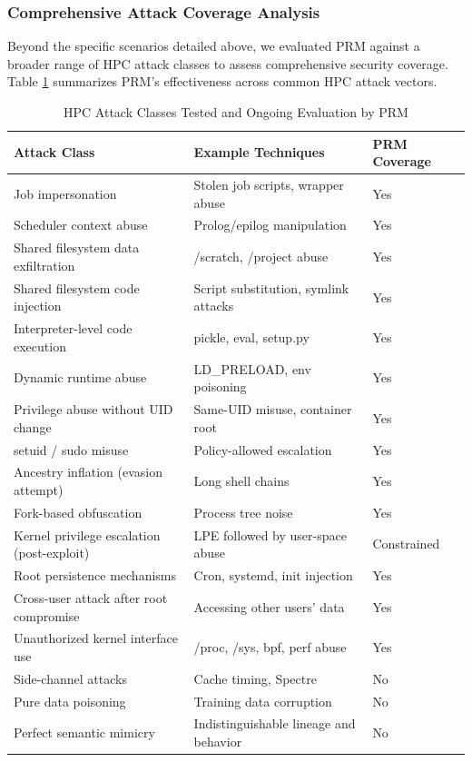 \documentclass[conference]{IEEEtran}
\begin{document}
\subsubsection{Comprehensive Attack Coverage Analysis}
Beyond the specific scenarios detailed above, we evaluated PRM against a broader range of HPC attack classes to assess comprehensive security coverage. Table \ref{tab:attack_coverage_comprehensive} summarizes PRM's effectiveness across common HPC attack vectors.

\begin{table}[htbp]
\centering
\caption{HPC Attack Classes Tested and Ongoing Evaluation by PRM}
\label{tab:attack_coverage_comprehensive}
\begin{tabular}{@{}p{4.5cm}p{4.5cm}p{2cm}@{}}
\toprule
\textbf{Attack Class} & \textbf{Example Techniques} & \textbf{PRM Coverage} \\
\midrule
Job impersonation & Stolen job scripts, wrapper abuse & Yes \\
Scheduler context abuse & Prolog/epilog manipulation & Yes \\
Shared filesystem data exfiltration & /scratch, /project abuse & Yes \\
Shared filesystem code injection & Script substitution, symlink attacks & Yes \\
Interpreter-level code execution & pickle, eval, setup.py & Yes \\
Dynamic runtime abuse & LD\_PRELOAD, env poisoning & Yes \\
Privilege abuse without UID change & Same-UID misuse, container root & Yes \\
setuid / sudo misuse & Policy-allowed escalation & Yes \\
Ancestry inflation (evasion attempt) & Long shell chains & Yes \\
Fork-based obfuscation & Process tree noise & Yes \\
\midrule
Kernel privilege escalation (post-exploit) & LPE followed by user-space abuse & Constrained \\
Root persistence mechanisms & Cron, systemd, init injection & Yes \\
Cross-user attack after root compromise & Accessing other users' data & Yes \\
Unauthorized kernel interface use & /proc, /sys, bpf, perf abuse & Yes \\
\midrule
Side-channel attacks & Cache timing, Spectre & No \\
Pure data poisoning & Training data corruption & No \\
Perfect semantic mimicry & Indistinguishable lineage and behavior & No \\
\bottomrule
\end{tabular}
\end{table}
\end{document}
